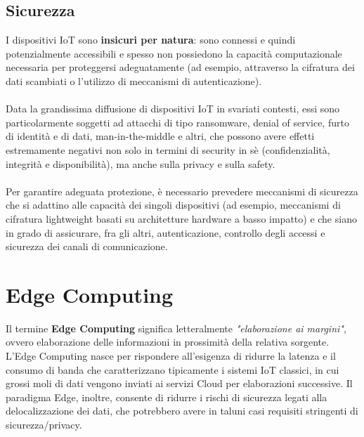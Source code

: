 \subsection{Sicurezza}
I dispositivi IoT sono \textbf{insicuri per natura}: sono connessi e quindi potenzialmente accessibili e spesso non possiedono la capacità computazionale necessaria per proteggersi adeguatamente (ad esempio, attraverso la cifratura dei dati scambiati o l’utilizzo di meccanismi di autenticazione). 
\\
\\
Data la grandissima diffusione di dispositivi IoT in svariati contesti, essi sono
particolarmente soggetti ad attacchi di tipo ransomware, denial of service, furto di identità
e di dati, man-in-the-middle e altri, che possono avere effetti estremamente negativi non
solo in termini di security in sè (confidenzialità, integrità e disponibilità), ma anche sulla
privacy e sulla safety.
\\
\\
Per garantire adeguata protezione, è necessario prevedere meccanismi di sicurezza che si
adattino alle capacità dei singoli dispositivi (ad esempio, meccanismi di cifratura
lightweight basati su architetture hardware a basso impatto) e che siano in grado di
assicurare, fra gli altri, autenticazione, controllo degli accessi e sicurezza dei canali di
comunicazione.

\section{Edge Computing}
Il termine \textbf{Edge Computing} significa letteralmente \textit{"elaborazione ai margini"}, ovvero elaborazione delle informazioni in prossimità della relativa sorgente. L’Edge Computing nasce per rispondere all’esigenza di ridurre la latenza e il consumo di banda che caratterizzano tipicamente i sistemi IoT classici, in cui grossi moli di dati vengono inviati ai servizi Cloud per elaborazioni successive. Il paradigma Edge, inoltre, consente di ridurre i rischi di sicurezza legati alla delocalizzazione dei dati, che potrebbero avere in taluni casi requisiti stringenti di sicurezza/privacy.

